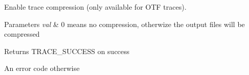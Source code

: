 Enable trace compression (only available for O\-T\-F traces). 


\begin{DoxyParams}{Parameters}
{\em val} & 0 means no compression, otherwize the output files will be compressed \\
\hline
\end{DoxyParams}
\begin{DoxyReturn}{Returns}
T\-R\-A\-C\-E\-\_\-\-S\-U\-C\-C\-E\-S\-S on success \par
 An error code otherwise 
\end{DoxyReturn}
